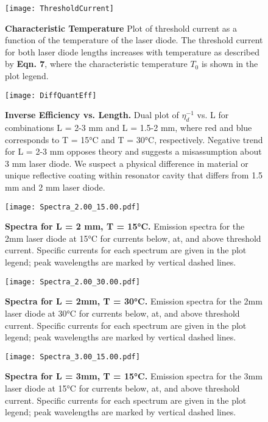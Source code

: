 \documentclass[9pt,twocolumn,twoside]{osajnl}
\begin{document}
\begin{figure}[H]
\centering
\texttt{[image: ThresholdCurrent]}
\caption{\textbf{Characteristic Temperature} Plot of threshold current as a function of the temperature of the laser diode. The threshold current for both laser diode lengths increases with temperature as described by \textbf{Eqn. 7}, where the characteristic temperature $T_0$ is shown in the plot legend.}
\label{fig:CharTemp}
\end{figure}

\begin{figure}[H]
\centering
\texttt{[image: DiffQuantEff]}
\caption{\textbf{Inverse Efficiency vs. Length.} Dual plot of $\eta_d^{-1}$ vs. L for combinations L = 2-3 mm and L = 1.5-2 mm, where red and blue corresponds to T = 15°C and T = 30°C, respectively. Negative trend for L = 2-3 mm opposes theory and suggests a misassumption about 3 mm laser diode. We suspect a physical difference in material or unique reflective coating within resonator cavity that differs from 1.5 mm and 2 mm laser diode.}
\label{fig:QuantEff}
\end{figure}


\begin{figure}[H]
\centering
\texttt{[image: Spectra\_2.00\_15.00.pdf]}
\caption{\textbf{Spectra for L = 2 mm, T = 15°C.} Emission spectra for the 2mm laser diode at 15°C for currents below, at, and above threshold current. Specific currents for each spectrum are given in the plot legend; peak wavelengths are marked by vertical dashed lines.}
\label{fig:false-color}
\end{figure}



\begin{figure}[H]
\centering
\texttt{[image: Spectra\_2.00\_30.00.pdf]}
\caption{\textbf{Spectra for L = 2mm, T = 30°C.} Emission spectra for the 2mm laser diode at 30°C for currents below, at, and above threshold current. Specific currents for each spectrum are given in the plot legend; peak wavelengths are marked by vertical dashed lines.}
\label{fig:false-color}
\end{figure}


\begin{figure}[H]
\centering
\texttt{[image: Spectra\_3.00\_15.00.pdf]}
\caption{\textbf{Spectra for L = 3mm, T = 15°C.} Emission spectra for the 3mm laser diode at 15°C for currents below, at, and above threshold current. Specific currents for each spectrum are given in the plot legend; peak wavelengths are marked by vertical dashed lines.}
\label{fig:false-color}
\end{figure}
\end{document}
